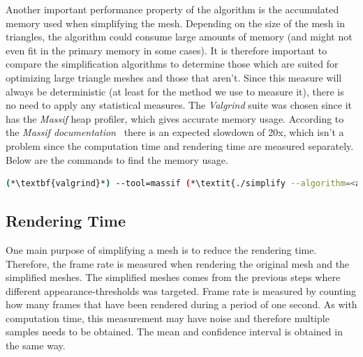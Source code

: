Another important performance property of the algorithm is the accumulated memory used when simplifying the mesh. Depending on the size of the mesh in triangles, the algorithm could consume large amounts of memory (and might not even fit in the primary memory in some cases). It is therefore important to compare the simplification algorithms to determine those which are suited for optimizing large triangle meshes and those that aren't. Since this measure will always be deterministic (at least for the method we use to measure it), there is no need to apply any statistical measures. The \emph{Valgrind} suite was chosen since it has the \emph{Massif} heap profiler, which gives accurate memory usage. According to the \emph{Massif documentation}~\cite{valgrind2017manual} there is an expected slowdown of 20x, which isn't a problem since the computation time and rendering time are measured separately. Below are the commands to find the memory usage.

\begin{lstlisting}[language=bash]
  (*\textbf{valgrind}*) --tool=massif (*\textit{./simplify --algorithm=<algorithm> <input-mesh> <output-mesh>}*)
\end{lstlisting}

\subsection{Rendering Time} \label{sec:rendering_time}
One main purpose of simplifying a mesh is to reduce the rendering time. Therefore, the frame rate is measured when rendering the original mesh and the simplified meshes. The simplified meshes comes from the previous steps where different appearance-thresholds was targeted. Frame rate is measured by counting how many frames that have been rendered during a period of one second. As with computation time, this measurement may have noise and therefore multiple samples needs to be obtained. The mean and confidence interval is obtained in the same way.


